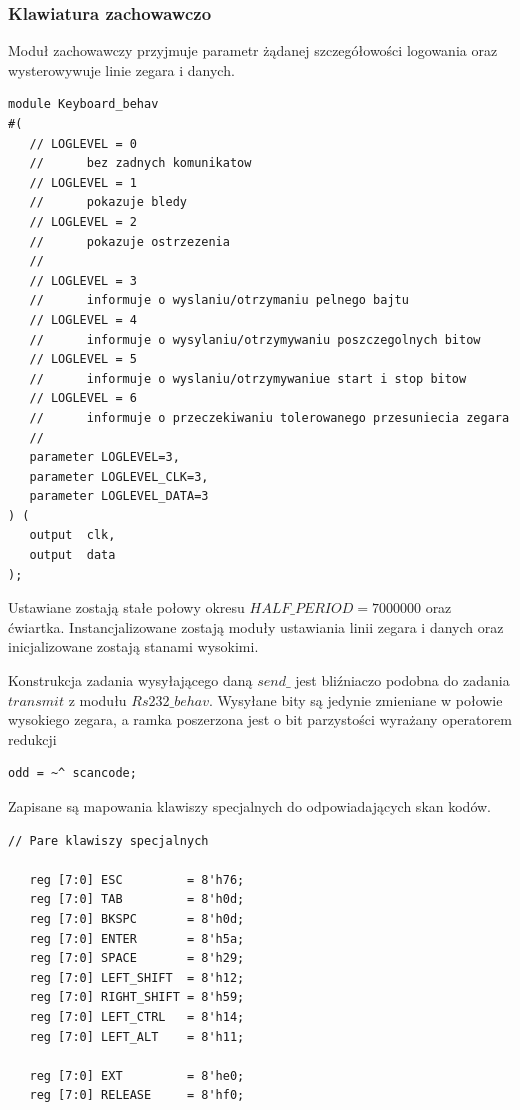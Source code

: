 \documentclass[a4paper,12pt]{article}
\begin{document}
\subsubsection{Klawiatura zachowawczo}

Moduł zachowawczy przyjmuje parametr żądanej szczegółowości logowania oraz wysterowywuje linie zegara i danych.

\begin{lstlisting}[label=Keyboard_behav,caption=Keyboard\_behav.v]
module Keyboard_behav
#(
   // LOGLEVEL = 0
   //      bez zadnych komunikatow
   // LOGLEVEL = 1
   //      pokazuje bledy
   // LOGLEVEL = 2
   //      pokazuje ostrzezenia
   //
   // LOGLEVEL = 3
   //      informuje o wyslaniu/otrzymaniu pelnego bajtu
   // LOGLEVEL = 4
   //      informuje o wysylaniu/otrzymywaniu poszczegolnych bitow
   // LOGLEVEL = 5
   //      informuje o wyslaniu/otrzymywaniue start i stop bitow
   // LOGLEVEL = 6
   //      informuje o przeczekiwaniu tolerowanego przesuniecia zegara
   //
   parameter LOGLEVEL=3,
   parameter LOGLEVEL_CLK=3,
   parameter LOGLEVEL_DATA=3
) (
   output  clk,
   output  data
);
\end{lstlisting}

Ustawiane zostają stałe połowy okresu $HALF\_PERIOD = 7 000 000$ oraz ćwiartka. Instancjalizowane zostają moduły ustawiania linii zegara i danych oraz inicjalizowane zostają stanami wysokimi.

Konstrukcja zadania wysyłającego daną $send\_$ jest bliźniaczo podobna do zadania $transmit$ z modułu $Rs232\_behav$. Wysyłane bity są jedynie zmieniane w połowie wysokiego zegara, a ramka poszerzona jest o bit parzystości wyrażany operatorem redukcji
\begin{lstlisting}[label=Keyboard_behav,caption=Keyboard\_behav.v,firstnumber=75]
	 odd = ~^ scancode;
\end{lstlisting}

Zapisane są mapowania klawiszy specjalnych do odpowiadających skan kodów.
\begin{lstlisting}[label=Keyboard_behav,caption=Keyboard\_behav.v,firstnumber=110]
   // Pare klawiszy specjalnych

   reg [7:0] ESC         = 8'h76;
   reg [7:0] TAB         = 8'h0d;
   reg [7:0] BKSPC       = 8'h0d;
   reg [7:0] ENTER       = 8'h5a;
   reg [7:0] SPACE       = 8'h29;
   reg [7:0] LEFT_SHIFT  = 8'h12;
   reg [7:0] RIGHT_SHIFT = 8'h59;
   reg [7:0] LEFT_CTRL   = 8'h14;
   reg [7:0] LEFT_ALT    = 8'h11;

   reg [7:0] EXT         = 8'he0;
   reg [7:0] RELEASE     = 8'hf0;
\end{lstlisting}
\end{document}

